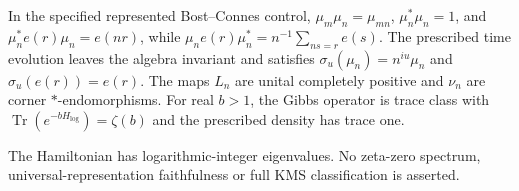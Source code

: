 \begin{proposition}
\statusProved{}
In the specified represented Bost--Connes control, $\mu_m\mu_n=\mu_{mn}$,
$\mu_n^*\mu_n=1$, and $\mu_n^*e(r)\mu_n=e(nr)$, while
$\mu_ne(r)\mu_n^*=n^{-1}\sum_{ns=r}e(s)$. The prescribed time evolution leaves the
algebra invariant and satisfies $\sigma_u(\mu_n)=n^{iu}\mu_n$ and
$\sigma_u(e(r))=e(r)$. The maps $L_n$ are unital completely positive and $\nu_n$ are
corner $*$-endomorphisms. For real $b>1$, the Gibbs operator is trace class with
$\operatorname{Tr}(e^{-bH_{\log}})=\zeta(b)$ and the prescribed density has trace
one.
\end{proposition}
\begin{scope}
The Hamiltonian has logarithmic-integer eigenvalues. No zeta-zero spectrum, universal-representation faithfulness or full KMS classification is asserted.
\end{scope}

